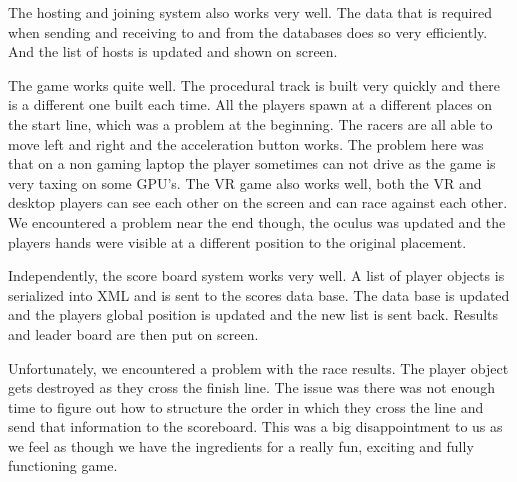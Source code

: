 The hosting and joining system also works very well. The data that is required when sending and receiving to and from the databases does so very efficiently. And the list of hosts is updated and shown on screen.
\newline

The game works quite well. The procedural track is built very quickly and there is a different one built each time. All the players spawn at a different places on the start line, which was a problem at the beginning. The racers are all able to move left and right and the acceleration button works. The problem here was that on a non gaming laptop the player sometimes can not drive as the game is very taxing on some GPU's. The VR game also works well, both the VR and desktop players can see each other on the screen and can race against each other. We encountered a problem near the end though, the oculus was updated and the players hands were visible at a different position to the original placement.
\newline

Independently, the score board system works very well. A list of player objects is serialized into XML and is sent to the scores data base. The data base is updated and the players global position is updated and the new list is sent back. Results and leader board are then put on screen.
\newline

Unfortunately, we encountered a problem with the race results. The player object gets destroyed as they cross the finish line. The issue was there was not enough time to figure out how to structure the order in which they cross the line and send that information to the scoreboard. This was a big disappointment to us as we feel as though we have the ingredients for a really fun, exciting and fully functioning game.




